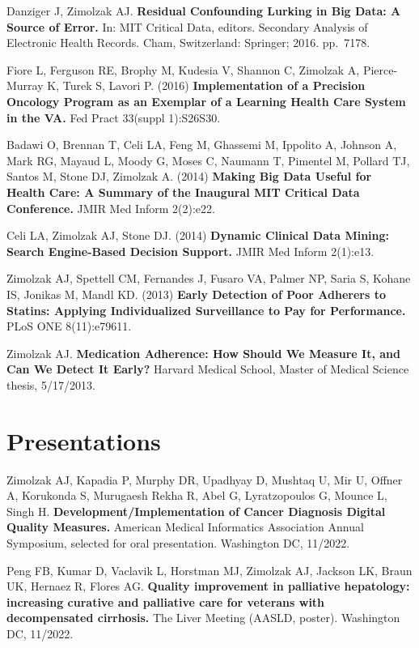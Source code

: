 \documentclass[10pt]{article}
\begin{document}
Danziger J, Zimolzak AJ. \textbf{Residual Confounding Lurking in Big
  Data: A Source of Error.} In: MIT Critical Data, editors. Secondary
Analysis of Electronic Health Records. Cham, Switzerland: Springer;
2016. pp.\ 71\ndash{}78.

Fiore L, Ferguson RE, Brophy M, Kudesia V, Shannon C, Zimolzak A,
Pierce-Murray K, Turek S, Lavori P. (2016) \textbf{Implementation of a
  Precision Oncology Program as an Exemplar of a Learning Health Care
  System in the VA.} Fed Pract 33(suppl 1):S26\ndash{}S30.

Badawi O, Brennan T, Celi LA, Feng M, Ghassemi M, Ippolito A, Johnson
A, Mark RG, Mayaud L, Moody G, Moses C, Naumann T, Pimentel M, Pollard
TJ, Santos M, Stone DJ, Zimolzak A. (2014) \textbf{Making Big Data
  Useful for Health Care: A Summary of the Inaugural MIT Critical Data
  Conference.} JMIR Med Inform 2(2):e22.

Celi LA, Zimolzak AJ, Stone DJ. (2014) \textbf{Dynamic Clinical Data
  Mining: Search Engine-Based Decision Support.} JMIR Med Inform
2(1):e13.

Zimolzak AJ, Spettell CM, Fernandes J, Fusaro VA, Palmer NP, Saria S,
Kohane IS, Jonikas M, Mandl KD. (2013) \textbf{Early Detection of Poor
  Adherers to Statins: Applying Individualized Surveillance to Pay for
  Performance.} PLoS ONE 8(11):e79611.

Zimolzak AJ. \textbf{Medication Adherence: How Should We Measure It,
  and Can We Detect It Early?} Harvard Medical School, Master of
Medical Science thesis, 5/17/2013.




\section*{Presentations} %



Zimolzak AJ, Kapadia P, Murphy DR, Upadhyay D, Mushtaq U, Mir U,
Offner A, Korukonda S, Murugaesh Rekha R, Abel G, Lyratzopoulos G,
Mounce L, Singh H. \textbf{Development/Implementation of Cancer
  Diagnosis Digital Quality Measures.} American Medical Informatics
Association Annual Symposium, selected for oral presentation.
Washington DC, 11/2022.

Peng FB, Kumar D, Vaclavik L, Horstman MJ, Zimolzak AJ, Jackson LK,
Braun UK, Hernaez R, Flores AG. \textbf{Quality improvement in
  palliative hepatology: increasing curative and palliative care for
  veterans with decompensated cirrhosis.} The Liver Meeting (AASLD,
poster). Washington DC, 11/2022.
\end{document}
